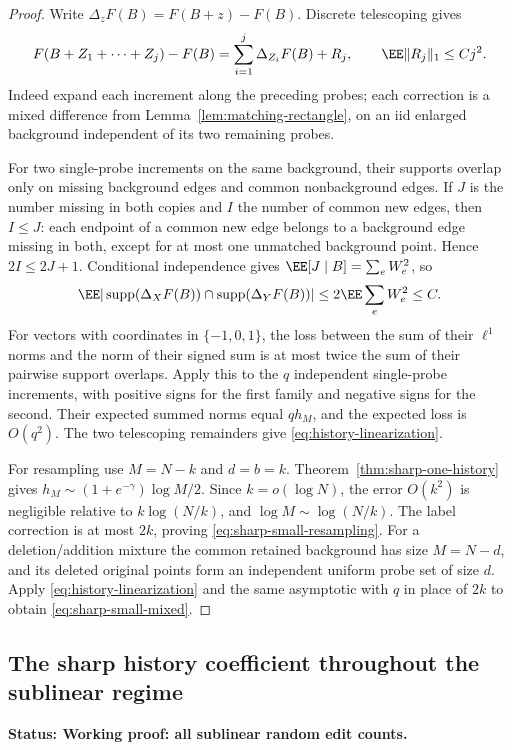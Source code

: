 \documentclass[11pt,letterpaper]{article}
\newcommand{\status}[1]{\textbf{Status: #1.}}
\begin{document}
\begin{proof}
Write $\Delta_zF(B)=F(B+z)-F(B)$. Discrete telescoping gives
\[
 F(B+Z_1+\cdots+Z_j)-F(B)
       =\sum_{i=1}^j\Delta_{Z_i}F(B)+R_j,
 \qquad \EE\|R_j\|_1\le Cj^2.
\]
Indeed expand each increment along the preceding probes; each
correction is a mixed difference from
Lemma~\ref{lem:matching-rectangle}, on an iid enlarged background
independent of its two remaining probes.

For two single-probe increments on the same background, their supports
overlap only on missing background edges and common nonbackground
edges. If $J$ is the number missing in both copies and $I$ the number
of common new edges, then $I\le J$: each endpoint of a common new
edge belongs to a background edge missing in both, except for at
most one unmatched background point. Hence $2I\le2J+1$.
Conditional independence gives $\EE[J\mid B]=\sum_eW_e^2$, so
\[
 \EE|\operatorname{supp}(\Delta_XF(B))
          \cap\operatorname{supp}(\Delta_YF(B))|
       \le2\EE\sum_eW_e^2\le C.
\]
For vectors with coordinates in $\{-1,0,1\}$, the loss between
the sum of their $\ell^1$ norms and the norm of their signed sum is
at most twice the sum of their pairwise support overlaps.
Apply this to the $q$ independent single-probe increments, with
positive signs for the first family and negative signs for the second.
Their expected summed norms equal $q h_M$, and the expected loss is
$O(q^2)$. The two telescoping remainders give
\eqref{eq:history-linearization}.

For resampling use $M=N-k$ and $d=b=k$.
Theorem~\ref{thm:sharp-one-history} gives
$h_M\sim(1+e^{-\gamma})\log M/2$.
Since $k=o(\log N)$, the error $O(k^2)$ is negligible relative to
$k\log(N/k)$, and $\log M\sim\log(N/k)$.
The label correction is at most $2k$, proving
\eqref{eq:sharp-small-resampling}.
For a deletion/addition mixture the common retained background has
size $M=N-d$, and its deleted original points form an independent
uniform probe set of size $d$. Apply
\eqref{eq:history-linearization} and the same asymptotic with $q$
in place of $2k$ to obtain \eqref{eq:sharp-small-mixed}.
\end{proof}

\subsection{The sharp history coefficient throughout the sublinear regime}
\label{sec:sublinear-history}

\status{Working proof: all sublinear random edit counts}
\end{document}
